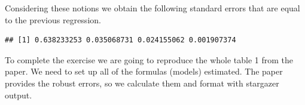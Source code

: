 \documentclass[]{book}
\newenvironment{Shaded}{\begin{snugshade}}{\end{snugshade}}
\newcommand{\KeywordTok}[1]{\textcolor[rgb]{0.13,0.29,0.53}{\textbf{#1}}}
\newcommand{\StringTok}[1]{\textcolor[rgb]{0.31,0.60,0.02}{#1}}
\newcommand{\OperatorTok}[1]{\textcolor[rgb]{0.81,0.36,0.00}{\textbf{#1}}}
\newcommand{\NormalTok}[1]{#1}
\begin{document}
Considering these notions we obtain the following standard errors that
are equal to the previous regression.

\begin{Shaded}
\end{Shaded}

\begin{verbatim}
## [1] 0.638233253 0.035068731 0.024155062 0.001907374
\end{verbatim}

To complete the exercise we are going to reproduce the whole table 1
from the paper. We need to set up all of the formulas (models)
estimated. The paper provides the robust errors, so we calculate them
and format with stargazer \citep{R-stargazer} output.
\end{document}
